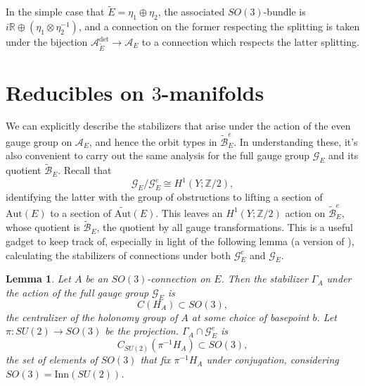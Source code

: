 \documentclass[10pt,a4paper]{amsart}
\newtheorem{lemma}[theorem]{Lemma}
\theoremstyle{definition}
\theoremstyle{remark}
\numberwithin{figure}{qchap}
\begin{document}
In the simple case that $\tilde E = \eta_1 \oplus \eta_2$, the associated $SO(3)$-bundle is $i\mathbb R \oplus (\eta_1 \otimes \eta_2^{-1})$, and a connection on the former respecting the splitting is taken under the bijection $\mathcal A_{\tilde E}^{\text{det}} \to \mathcal A_E$ to a connection which respects the latter splitting.

\section{Reducibles on $3$-manifolds}\label{sec:config-red-3d}
We can explicitly describe the stabilizers that arise under the action of the even gauge group on $\mathcal A_E$, and hence the orbit types in $\widetilde{\mathcal B}^e_E$. In understanding these, it's also convenient to carry out the same analysis for the full gauge group $\mathcal G_E$ and its quotient $\widetilde{\mathcal B}_E$. Recall that $$\mathcal G_E/\mathcal G^e_E \cong H^1(Y;\mathbb Z/2),$$ identifying the latter with the group of obstructions to lifting a section of $\text{Aut}(E)$ to a section of $\widetilde{\text{Aut}}(E)$. This leaves an $H^1(Y;\mathbb Z/2)$ action on $\widetilde{\mathcal B}^e_E$, whose quotient is $\widetilde{\mathcal B}_E$, the quotient by all gauge transformations. This is a useful gadget to keep track of, especially in light of the following lemma (a version of \cite[Lemma~4.28]{DK}), calculating the stabilizers of connections under both $\mathcal G^e_E$ and $\mathcal G_E$.

\begin{lemma}\label{stab1}Let $A$ be an $SO(3)$-connection on $E$. Then the stabilizer $\Gamma_A$ under the action of the full gauge group $\mathcal G_E$ is $$C(H_A) \subset SO(3),$$ the centralizer of the holonomy group of $A$ at some choice of basepoint $b$. Let $\pi: SU(2) \to SO(3)$ be the projection. $\Gamma_A \cap \mathcal G^e_E$ is $$C_{SU(2)}(\pi^{-1}H_A) \subset SO(3),$$ the set of elements of $SO(3)$ that fix $\pi^{-1}H_A$ under conjugation, considering $SO(3) = \text{Inn}(SU(2))$.
\end{lemma}
\end{document}
